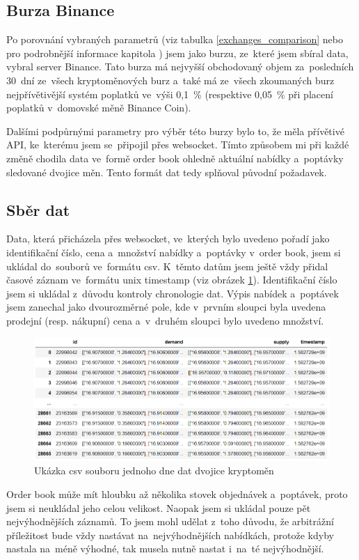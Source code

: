 \documentclass[thesis=B,czech]{FITthesis}[2019/03/21]
\begin{document}
\subsection{Burza Binance}
Po porovnání vybraných parametrů (viz tabulka \ref{exchanges_comparison} nebo pro podrobnější informace kapitola ) jsem jako burzu, ze~které jsem sbíral data, vybral server Binance. Tato burza má nejvyšší obchodovaný objem za~posledních 30~dní ze~všech kryptoměnových burz \cite{coinmarketcap} a~také má ze~všech zkoumaných burz nejpřívětivější systém poplatků ve~výši 0,1~\% (respektive 0,05~\% při placení poplatků v~domovské měně Binance Coin).

Dalšími podpůrnými parametry pro výběr této burzy bylo to, že měla přívětivé API, ke~kterému jsem se~připojil přes websocket. \cite{BinanceApi} Tímto způsobem mi při každé změně chodila data ve~formě order book ohledně aktuální nabídky a~poptávky sledované dvojice měn. Tento formát dat tedy splňoval původní požadavek. \cite{BinanceApi}

\subsection{Sběr dat}
Data, která přicházela přes websocket, ve~kterých bylo uvedeno pořadí jako identifikační číslo, cena a~množství nabídky a~poptávky v~order book, jsem si ukládal do~souborů ve~formátu csv. K~těmto datům jsem ještě vždy přidal časové záznam ve~formátu unix timestamp (viz obrázek \ref{csv_data}). Identifikační číslo jsem si ukládal z~důvodu kontroly chronologie dat. Výpis nabídek a~poptávek jsem zanechal jako dvourozměrné pole, kde v~prvním sloupci byla uvedena prodejní (resp. nákupní) cena a~v~druhém sloupci bylo uvedeno množství.

\begin{figure}\centering
	\includegraphics[width=1\textwidth]{images/csv_data.PNG}
	\caption{Ukázka csv souboru jednoho dne dat dvojice kryptoměn}\label{csv_data}
\end{figure}
Order book může mít hloubku až několika stovek objednávek a~poptávek, proto jsem si neukládal jeho celou velikost. Naopak jsem si ukládal pouze pět nejvýhodnějších záznamů. To jsem mohl udělat z~toho důvodu, že arbitrážní příležitost bude vždy nastávat na~nejvýhodnějších nabídkách, protože kdyby nastala na~méně výhodné, tak musela nutně nastat i~na~té nejvýhodnější. 
\end{document}
